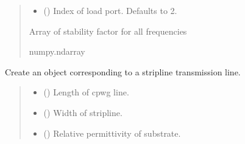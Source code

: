 \documentclass[letterpaper,10pt,english]{sphinxmanual}
\begin{document}
\begin{fulllineitems}
\begin{fulllineitems}
\begin{quote}
\begin{description}
\begin{itemize}
\item {}
\sphinxAtStartPar
{} (\sphinxstyleliteralemphasis{\sphinxupquote{, }}) \textendash{} Index of load port. Defaults to 2.

\end{itemize}

\sphinxAtStartPar
Array of stability factor for all frequencies

\sphinxAtStartPar
numpy.ndarray

\end{description}\end{quote}

\end{fulllineitems}


\begin{fulllineitems}
\label{\detokenize{touchstone:touchstone.spfile.stripline}}
\pysigstartsignatures
{}
\pysigstopsignatures
\sphinxAtStartPar
Create an  object corresponding to a stripline transmission line.
\begin{quote}\begin{description}
\begin{itemize}
\item {}
\sphinxAtStartPar
{} () \textendash{} Length of cpwg line.

\item {}
\sphinxAtStartPar
{} () \textendash{} Width of stripline.

\item {}
\sphinxAtStartPar
{} () \textendash{} Relative permittivity of substrate.


\end{itemize}
\end{description}
\end{quote}
\end{fulllineitems}
\end{fulllineitems}
\end{document}
